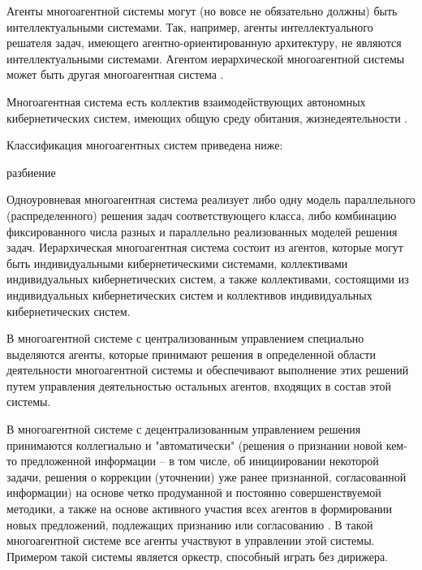 \begin{SCn}
\end{SCn}


Агенты многоагентной системы могут (но вовсе не обязательно должны) быть интеллектуальными системами. 
Так, например, агенты интеллектуального решателя задач, имеющего агентно-ориентированную архитектуру, не являются интеллектуальными системами. 
Агентом иерархической многоагентной системы может быть другая многоагентная система .

Многоагентная система есть коллектив взаимодействующих автономных кибернетических систем, имеющих общую среду обитания, жизнедеятельности . 

Классификация многоагентных систем приведена ниже:

\begin{SCn}
\begin{scnrelfromset}{разбиение}
\end{scnrelfromset}
\end{SCn}

Одноуровневая многоагентная система реализует либо одну модель параллельного (распределенного) решения задач соответствующего класса, либо комбинацию фиксированного числа разных и параллельно реализованных моделей решения задач. 
Иерархическая многоагентная система состоит из агентов, которые могут быть индивидуальными кибернетическими системами, коллективами индивидуальных кибернетических систем, а также коллективами, состоящими из индивидуальных кибернетических систем и коллективов индивидуальных кибернетических систем.

В многоагентной системе с централизованным управлением специально выделяются агенты, которые принимают решения в определенной области деятельности многоагентной системы и обеспечивают выполнение этих решений путем управления деятельностью остальных агентов, входящих в состав этой системы.

В многоагентной системе с децентрализованным управлением решения принимаются коллегиально и "автоматически"{} (решения о признании новой кем-то предложенной информации – в том числе, об инициировании некоторой задачи, решения о коррекции (уточнении) уже ранее признанной, согласованной информации) на основе четко продуманной и постоянно совершенствуемой методики, а также на основе активного участия всех агентов в формировании новых предложений, подлежащих признанию или согласованию . 
В такой многоагентной системе все агенты участвуют в управлении этой системы. 
Примером такой системы является оркестр, способный играть без дирижера.


